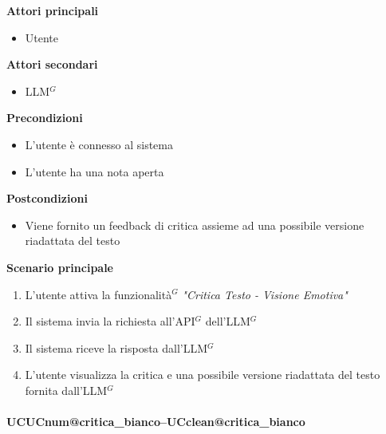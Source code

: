 \documentclass[a4paper,10pt]{article}
\makeatletter
\def\UCText#1{UC\csname UCnum@#1\endcsname\space--\space\csname UCclean@#1\endcsname}%
\makeatother
\begin{document}
    \textbf{Attori principali}
    \begin{itemize}
        \item Utente
    \end{itemize}
    \textbf{Attori secondari}
    \begin{itemize}
        \item LLM$^G$
    \end{itemize}
    \textbf{Precondizioni}
    \begin{itemize}
        \item L'utente è connesso al sistema
        \item L'utente ha una nota aperta
    \end{itemize}
    \textbf{Postcondizioni}
    \begin{itemize}
        \item Viene fornito un feedback di critica assieme ad una possibile versione riadattata del testo
    \end{itemize}
    \textbf{Scenario principale}
    \begin{enumerate}
        \item L'utente attiva la funzionalità$^G$ \textit{"Critica Testo - Visione Emotiva"}
        \item Il sistema invia la richiesta all'API$^G$ dell'LLM$^G$
        \item Il sistema riceve la risposta dall'LLM$^G$
        \item L'utente visualizza la critica e una possibile versione riadattata del testo fornita dall'LLM$^G$
    \end{enumerate}

    \paragraph{\UCText{critica_bianco}}
\end{document}
